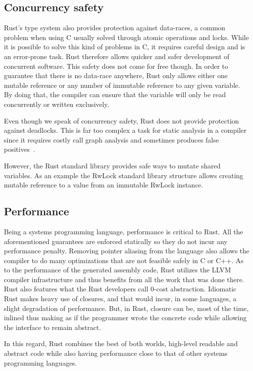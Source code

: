 \subsection{Concurrency safety}

Rust's type system also provides protection against data-races, a
common problem when using C usually solved through atomic operations
and locks. While it is possible to solve this kind of problems in C,
it requires careful design and is an error-prone task. Rust therefore
allows quicker and safer development of concurrent software. This safety
does not come for free though. In order to guarantee that there is no
data-race anywhere, Rust only allows either one mutable reference or
any number of immutable reference to any given variable. By doing
that, the compiler can ensure that the variable will only be read
concurrently or written exclusively.

Even though we speak of concurrency safety, Rust does not provide
protection against deadlocks. This is far too complex a task for
static analysis in a compiler since it requires costly call graph
analysis and sometimes produces false
positives~\cite{deadlock-detection}.

However, the Rust standard library provides safe ways to mutate shared
variables. As an example the RwLock standard library structure allows
creating mutable reference to a value from an immutable RwLock instance.

\subsection{Performance}

Being a systems programming language, performance is critical to
Rust. All the aforementioned guarantees are enforced statically so
they do not incur any performance penalty. Removing pointer aliasing
from the language also allows the compiler to do many optimizations
that are not feasible safely in C or C++. As to the performance of the
generated assembly code, Rust utilizes the LLVM compiler
infrastructure and thus benefits from all the work that was done
there. Rust also features what the Rust developers call 0-cost
abstraction. Idiomatic Rust makes heavy use of closures, and that
would incur, in some languages, a slight degradation of
performance. But, in Rust, closure can be, most of the time, inlined
thus making as if the programmer wrote the concrete code while
allowing the interface to remain abstract.

In this regard, Rust combines the best of both worlds, high-level
readable and abstract code while also having performance close to that
of other systems programming languages.


